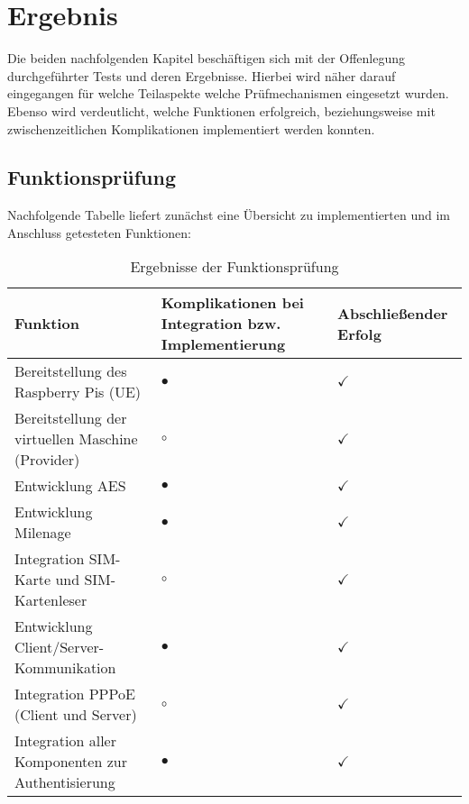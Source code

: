 \section[Ergebnis (Schenkel)]{Ergebnis}
	Die beiden nachfolgenden Kapitel beschäftigen sich mit der Offenlegung durchgeführter Tests und deren Ergebnisse.
	Hierbei wird näher darauf eingegangen für welche Teilaspekte welche Prüfmechanismen
	eingesetzt wurden. Ebenso wird verdeutlicht, welche Funktionen erfolgreich, beziehungsweise
	mit zwischenzeitlichen Komplikationen implementiert werden konnten.

	\subsection[Funktionsprüfung (Schenkel)]{Funktionsprüfung}
	\label{ergebnis-tests}
	Nachfolgende Tabelle liefert zunächst eine Übersicht zu implementierten und im Anschluss
	getesteten Funktionen:\vspace*{5mm}

	\begin{table}[h]
	\begin{tabularx}{\textwidth}{|X||X|X|}
    \hline
      \textbf{Funktion} & \textbf{Komplikationen bei Integration bzw. Implementierung} & \textbf{Abschließender Erfolg} \\
    \hline
    \hline
     	Bereitstellung des Raspberry Pis (UE) & $\bullet$ & $\checkmark$ \\
    \hline
    \hline
     	Bereitstellung der virtuellen Maschine (Provider) & $\circ$ & $\checkmark$ \\
    \hline
    \hline
     	Entwicklung AES & $\bullet$ & $\checkmark$ \\
    \hline
    \hline
    	Entwicklung Milenage & $\bullet$ & $\checkmark$ \\
    \hline
    \hline
    	Integration SIM-Karte und SIM-Kartenleser & $\circ$ & $\checkmark$ \\
    \hline
    \hline
    	Entwicklung Client/Server-Kommunikation & $\bullet$ & $\checkmark$ \\
    \hline
    \hline
    	Integration PPPoE (Client und Server) & $\circ$ & $\checkmark$ \\
    \hline
    \hline
    	Integration aller Komponenten zur Authentisierung & $\bullet$ & $\checkmark$ \\
    \hline
    \end{tabularx}
    \caption{Ergebnisse der Funktionsprüfung}
    \end{table}

